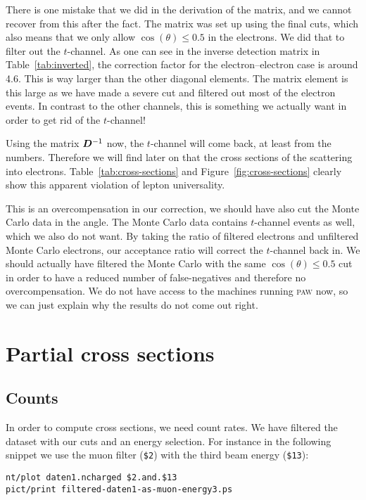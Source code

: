 \documentclass[11pt, english, fleqn, DIV=15, headinclude, BCOR=2cm]{scrreprt}
\begin{document}
There is one mistake that we did in the derivation of the matrix, and we cannot
recover from this after the fact. The matrix was set up using the final cuts,
which also means that we only allow $\cos(\theta) \leq \num{0.5}$ in the
electrons. We did that to filter out the $t$-channel. As one can see in the
inverse detection matrix in Table~\ref{tab:inverted}, the correction factor for
the electron--electron case is around \num{4.6}. This is way larger than the
other diagonal elements. The matrix element is this large as we have made a
severe cut and filtered out most of the electron events. In contrast to the
other channels, this is something we actually want in order to get rid of the
$t$-channel!

Using the matrix $\mat D\inv$ now, the $t$-channel will come back, at least
from the numbers. Therefore we will find later on that the cross sections of
the scattering into electrons. Table~\ref{tab:cross-sections} and
Figure~\ref{fig:cross-sections} clearly show this apparent violation of lepton
universality.

This is an overcompensation in our correction, we should have also cut the
Monte Carlo data in the angle. The Monte Carlo data contains $t$-channel events
as well, which we also do not want. By taking the ratio of filtered electrons
and unfiltered Monte Carlo electrons, our acceptance ratio will correct the
$t$-channel back in. We should actually have filtered the Monte Carlo with the
same $\cos(\theta) \leq \num{0.5}$ cut in order to have a reduced number of
false-negatives and therefore no overcompensation. We do not have access to the
machines running \textsc{paw} now, so we can just explain why the results do
not come out right.

\section{Partial cross sections}

\subsection{Counts}

In order to compute cross sections, we need count rates. We have filtered the
dataset with our cuts and an energy selection. For instance in the following
snippet we use the muon filter (\texttt{\$2}) with the third beam energy
(\texttt{\$13}):

\begin{lstlisting}
nt/plot daten1.ncharged $2.and.$13
pict/print filtered-daten1-as-muon-energy3.ps
\end{lstlisting}
\end{document}

